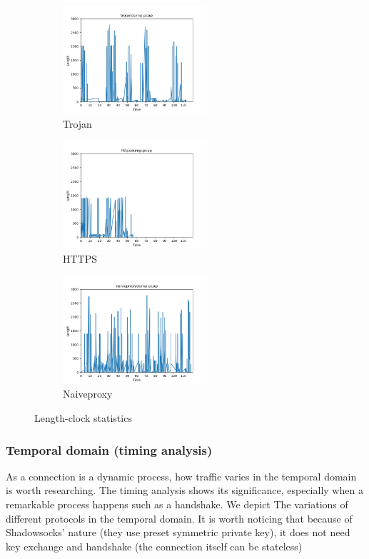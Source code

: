 \documentclass[conference]{IEEEtran}
\begin{document}
\begin{figure}[H]
    \centering
    \begin{subfigure}[b]{0.40\textwidth}
        \includegraphics[width=\textwidth, height=4cm]{pics/temporal_statistic_of_length_trojan.png}
        \caption{Trojan}
    \end{subfigure}
    \hfill
    \begin{subfigure}[b]{0.40\textwidth}
        \includegraphics[width=\textwidth, height=4cm]{pics/temporal_statistic_of_length_https.png}
        \caption{HTTPS}
    \end{subfigure}
    \hfill
    \begin{subfigure}[b]{0.40\textwidth}
        \includegraphics[width=\textwidth, height=4cm]{pics/temporal_statistic_of_length_naiveproxy.png}
        \caption{Naiveproxy}
    \end{subfigure}
    \caption{Length-clock statistics}
\end{figure}

\subsubsection{Temporal domain (timing analysis)}
As a connection is a dynamic process, how traffic varies in the temporal domain is worth researching. The timing analysis shows its significance, especially when a remarkable process happens such as a handshake. 
We depict The variations of different protocols in the temporal domain. It is worth noticing that because of Shadowsocks' nature (they use preset symmetric private key), it does not need key exchange and handshake (the connection itself can be stateless)
\end{document}
